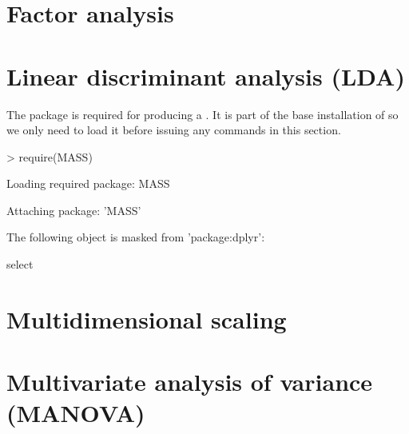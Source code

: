 \section{Factor analysis} 
 
\section{Linear discriminant analysis (LDA)} 
 
The  package is required for producing a . It is part of the base installation of \R{} so we only need to load it before issuing any commands in this section. 

\begin{Schunk}
\begin{Sinput}
> require(MASS) 
\end{Sinput}
\begin{Soutput}
Loading required package: MASS
\end{Soutput}
\begin{Soutput}

Attaching package: 'MASS'
\end{Soutput}
\begin{Soutput}
The following object is masked from 'package:dplyr':

    select
\end{Soutput}
\end{Schunk}

 
\section{Multidimensional scaling} 
 
\section{Multivariate analysis of variance (MANOVA)} 
 
 
\section{} 
 
 
\section{} 
 
 
\section{} 
 
 
\section{} 
 
 
\section{} 
 
 
\section{} 
 
 
 

